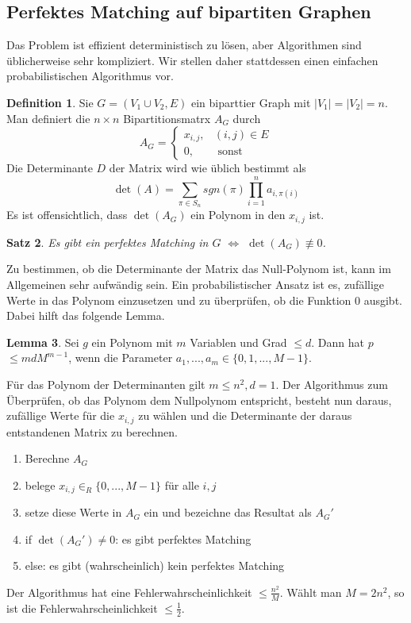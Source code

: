 \documentclass[a4paper, 12pt]{article}
\theoremstyle{plain}
\newtheorem{theorem}{Satz}[section] %
\theoremstyle{definition}
\newtheorem{definition}[theorem]{Definition} %
\theoremstyle{lemma}
\newtheorem{lemma}[theorem]{Lemma}
\theoremstyle{remark}
\theoremstyle{corollary}
\theoremstyle{example}
\begin{document}
	\subsection{Perfektes Matching auf bipartiten Graphen}
	Das Problem ist effizient deterministisch zu lösen, aber Algorithmen sind üblicherweise sehr kompliziert. Wir stellen daher stattdessen einen einfachen probabilistischen Algorithmus vor.
	\begin{definition}
		Sie $G = (V_1 \cup V_2, E)$ ein biparttier Graph mit $\left|V_1\right| = \left|V_2\right| = n$. Man definiert die $n\times n$ Bipartitionsmatrx $A_G$ durch \[A_G = \begin{cases}
			x_{i,j}, & (i,j) \in E\\
			0, & \text{ sonst}
		\end{cases}\]
	Die Determinante $D$ der Matrix wird wie üblich bestimmt als \[\det(A) = \sum_{\pi \in S_n} sgn(\pi) \prod_{i=1}^{n} a_{i,\pi(i)}\]
	Es ist offensichtlich, dass $\det(A_G)$ ein Polynom in den $x_{i,j}$ ist.
	\end{definition}
	\begin{theorem}
		Es gibt ein perfektes Matching in $G$ $\Leftrightarrow$ $\det(A_G) \not \equiv 0$.
	\end{theorem}
	Zu bestimmen, ob die Determinante der Matrix das Null-Polynom ist, kann im Allgemeinen sehr aufwändig sein. Ein probabilistischer Ansatz ist es, zufällige Werte in das Polynom einzusetzen und zu überprüfen, ob die Funktion 0 ausgibt. Dabei hilft das folgende Lemma.
	\begin{lemma}
		Sei $g$ ein Polynom mit $m$ Variablen und Grad $\leq d$. Dann hat $p$ $\leq mdM^{m-1}$, wenn die Parameter $a_1,...,a_m \in \{0,1,...,M-1\}$.
	\end{lemma}
	Für das Polynom der Determinanten gilt $m\leq n^2, d=1$. Der Algorithmus zum Überprüfen, ob das Polynom dem Nullpolynom entspricht, besteht nun daraus, zufällige Werte für die $x_{i,j}$ zu wählen und die Determinante der daraus entstandenen Matrix zu berechnen.
	\begin{enumerate}
		\item Berechne $A_G$
		\item belege $x_{i,j} \in_R \{0,...,M-1\}$ für alle $i,j$
		\item setze diese Werte in $A_G$ ein und bezeichne das Resultat als $A_G'$
		\item if $\det(A_G') \neq 0$: es gibt perfektes Matching
		\item else: es gibt (wahrscheinlich) kein perfektes Matching
	\end{enumerate}
	Der Algorithmus hat eine Fehlerwahrscheinlichkeit $\leq \frac{n^2}{M}$. Wählt man $M = 2n^2$, so ist die Fehlerwahrscheinlichkeit $\leq \frac{1}{2}$.
\end{document}
